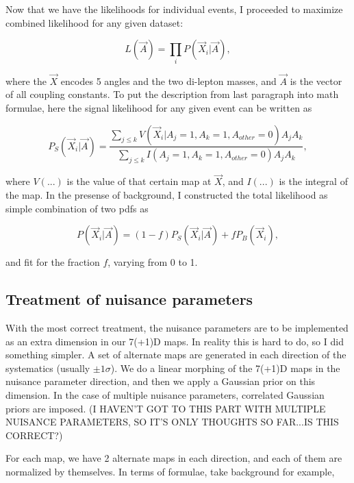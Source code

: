 \documentclass{cmspaper}
\begin{document}
Now that we have the likelihoods for individual events, I proceeded to
maximize combined likelihood for any given dataset:

\begin{equation}
L(\vec{A}) = \prod_i P(\vec{X}_i | \vec{A}),
\end{equation}

where the $\vec{X}$ encodes 5 angles and the two di-lepton masses, and
$\vec{A}$ is the vector of all coupling constants.  To put the description
from last paragraph into math formulae, here the signal likelihood
for any given event can be written as

\begin{equation}
P_S(\vec{X}_i | \vec{A}) = \dfrac{\sum_{j \leq k} V(\vec{X}_i | A_j=1, A_k=1, A_{other}=0) A_j A_k}{\sum_{j \leq k} I(A_j=1, A_k=1, A_{other}=0) A_j A_k},
\end{equation}

where $V(...)$ is the value of that certain map at $\vec{X}$, and $I(...)$
is the integral of the map.  In the presense of background, I constructed
the total likelihood as simple combination of two pdfs as

\begin{equation}
P(\vec{X}_i | \vec{A}) = (1-f) P_S(\vec{X}_i | \vec{A}) + f P_B(\vec{X}_i),
\end{equation}

and fit for the fraction $f$, varying from 0 to 1.

\subsection{Treatment of nuisance parameters}

With the most correct treatment, the nuisance parameters are to be implemented
as an extra dimension in our 7(+1)D maps.  In reality this is hard to do, so
I did something simpler.  A set of alternate maps are generated in each
direction of the systematics (usually $\pm 1 \sigma$).  We do a linear
morphing of the 7(+1)D maps in the nuisance parameter direction, and then
we apply a Gaussian prior on this dimension.  In the case of multiple
nuisance parameters, correlated Gaussian priors are imposed. (I HAVEN'T
GOT TO THIS PART WITH MULTIPLE NUISANCE PARAMETERS, SO IT'S ONLY THOUGHTS
SO FAR...IS THIS CORRECT?)

For each map, we have 2 alternate maps in each direction, and each of them are
normalized by themselves.  In terms of formulae, take background for example,
\end{document}
